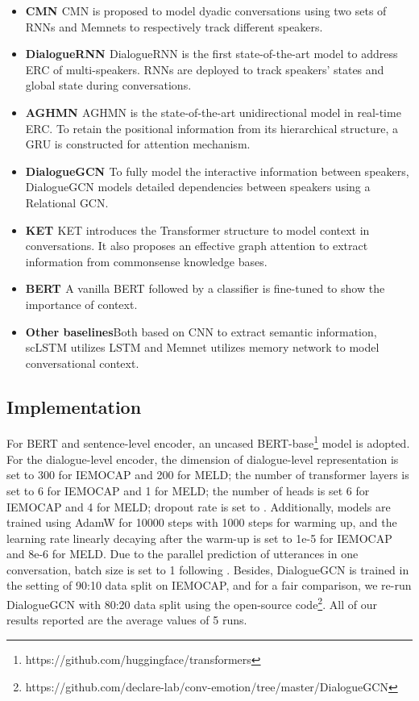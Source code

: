 \documentclass[letterpaper]{article} \usepackage{aaai21}  \usepackage{times}  \usepackage{helvet} \usepackage{courier}  \usepackage[hyphens]{url}  \usepackage{graphicx} \urlstyle{rm} \def\UrlFont{\rm}  \usepackage{natbib}  \usepackage{caption} \usepackage{multirow}
\begin{document}
\begin{itemize}
    \item \textbf{CMN \citep{CMN}}\quad CMN is proposed to model dyadic conversations using two sets of RNNs and Memnets to respectively track different speakers. 
    \item \textbf{DialogueRNN \citep{DialogueRNN}}\quad DialogueRNN is the first state-of-the-art model to address ERC of multi-speakers. RNNs are deployed to track speakers' states and global state during conversations. 
    \item \textbf{AGHMN \citep{AGHMN}}\quad AGHMN is the state-of-the-art unidirectional model in real-time ERC. To retain the positional information from its hierarchical structure, a GRU is constructed for attention mechanism. 
    \item \textbf{DialogueGCN \citep{DialogueGCN}}\quad  To fully model the interactive information between speakers, DialogueGCN models detailed dependencies between speakers using a Relational GCN. 
    \item \textbf{KET \citep{KET}}\quad  KET introduces the Transformer structure to model context in conversations. It also proposes an effective graph attention to extract information from commonsense knowledge bases. 
    \item \textbf{BERT \citep{BERT}}\quad  A vanilla BERT followed by a classifier is fine-tuned to show the importance of context. 
    \item \textbf{Other baselines}\quad Both based on CNN to extract semantic information, scLSTM \citep{bcLSTM} utilizes LSTM \citep{LSTM} and Memnet \citep{MN} utilizes memory network to model conversational context. 
\end{itemize}

\subsection{Implementation}

For BERT and sentence-level encoder, an uncased BERT-base\footnote{https://github.com/huggingface/transformers} model is adopted. For the dialogue-level encoder, the dimension of dialogue-level representation is set to 300 for IEMOCAP and 200 for MELD; the number of transformer layers is set to 6 for IEMOCAP and 1 for MELD; the number of heads is set 6 for IEMOCAP and 4 for MELD; dropout rate is set to . Additionally, models are trained using AdamW \citep{Adam,Weight} for 10000 steps with 1000 steps for warming up, and the learning rate linearly decaying after the warm-up is set to 1e-5 for IEMOCAP and 8e-6 for MELD. Due to the parallel prediction of utterances in one conversation, batch size is set to 1 following \citet{AGHMN}. Besides, DialogueGCN is trained in the setting of 90:10 data split on IEMOCAP, and for a fair comparison, we re-run DialogueGCN with 80:20 data split using the open-source code\footnote{https://github.com/declare-lab/conv-emotion/tree/master/DialogueGCN}. All of our results reported are the average values of 5 runs.
\end{document}
